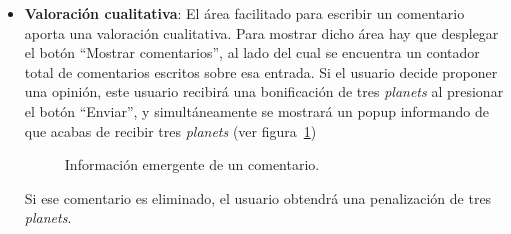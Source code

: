 \documentclass[a4paper, 12pt]{book}
\begin{document}
\begin{itemize}
  moneda de la aplicaci\'on). Si se decide por pulsar la valoraci\'on negativa (bot\'on rojo), el alumno que cre\'o la entrada recibir\'a una penalizaci\'on 
  de un \textit{planet}. Si un usuario presiona uno de los dos botones sobre una entrada, no podr\'a valorar m\'as veces en ella, ya que ambos botones 
  emerger\'an deshabilitados con su contador total. En este momento, el usuario podr\'a visualizar el total de valoraciones positivas y negativas que posee 
  esa entrada.
  \item {\bfseries Valoraci\'on cualitativa}: El \'area facilitado para escribir un comentario aporta una valoraci\'on cualitativa. Para mostrar dicho 
  \'area hay que desplegar el bot\'on ``Mostrar comentarios'', al lado del cual se encuentra un contador total de comentarios escritos sobre esa entrada.
  Si el usuario decide proponer una opini\'on, este usuario recibir\'a una bonificaci\'on de tres \textit{planets} al presionar el bot\'on ``Enviar'', y 
  simult\'aneamente se mostrar\'a un popup informando de que acabas de recibir tres \textit{planets} (ver figura~\ref{figura:hiloalumno6})
  \begin{figure}[htbp] 
    \centering
    \caption{Informaci\'on emergente de un comentario.}
    \label{figura:hiloalumno6}
  \end{figure}
  
  Si ese comentario es eliminado, el usuario obtendr\'a una penalizaci\'on de tres \textit{planets}.
  

\end{itemize}
\end{document}
